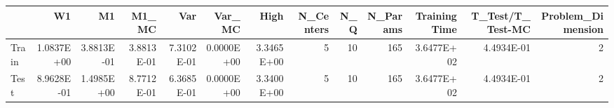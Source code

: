 \begin{tabular}{lrrrrrrrrrrrr}
\toprule
{} &         W1 &         M1 &      M1\_MC &        Var &     Var\_MC &       High &  N\_Centers &  N\_Q &  N\_Params &  Training Time &  T\_Test/T\_Test-MC &  Problem\_Dimension \\
\midrule
Train & 1.0837E+00 & 3.8813E-01 & 3.8813E-01 & 7.3102E-01 & 0.0000E+00 & 3.3465E+00 &          5 &   10 &       165 &     3.6477E+02 &        4.4934E-01 &                  2 \\
Test  & 8.9628E-01 & 1.4985E+00 & 8.7712E-01 & 6.3685E-01 & 0.0000E+00 & 3.3400E+00 &          5 &   10 &       165 &     3.6477E+02 &        4.4934E-01 &                  2 \\
\bottomrule
\end{tabular}
